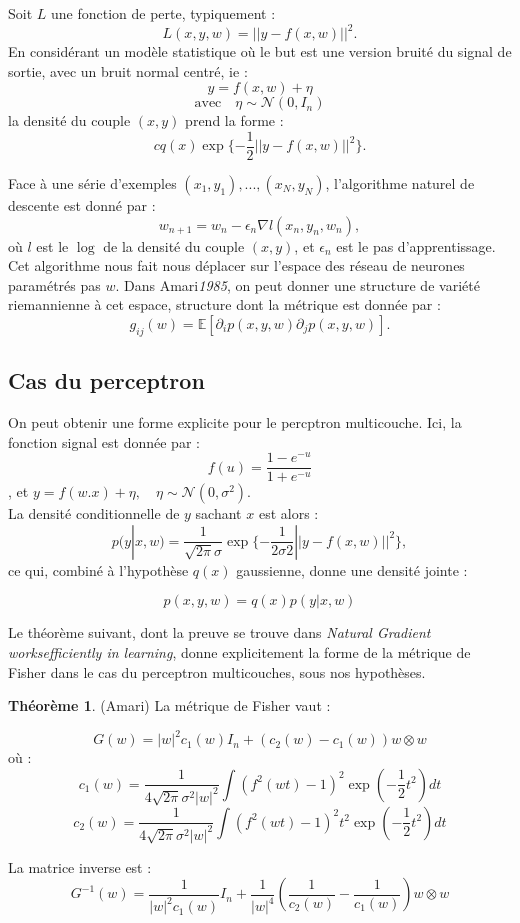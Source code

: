 \documentclass{article}
\theoremstyle{definition}
\newtheorem{thm}{Théorème}
\begin{document}
Soit $L$ une fonction de perte, typiquement : 
\[L(x,y,w)  = ||y-f(x,w)||^2.\] 
En considérant un modèle statistique où le but est une version bruité du signal de sortie, avec un bruit normal centré, ie :
\[y=f(x,w)+\eta\]
\[\text{avec} \quad \eta \sim \mathcal N (0,I_n)\]
la densité du couple $(x,y)$ prend la forme :
\[cq(x)\exp\{-\frac{1}{2}||y-f(x,w)||^2\}.\]

Face à une série d'exemples $(x_1,y_1),...,(x_N,y_N)$, l'algorithme naturel de descente est donné par :
\[w_{n+1}=w_n - \epsilon_n \nabla l(x_n,y_n,w_n), \]
où $l$ est le $\log$ de la densité du couple $(x,y)$, et $\epsilon_n$ est le pas d'apprentissage. Cet algorithme nous fait nous déplacer sur l'espace des réseau de neurones paramétrés pas $w$. Dans Amari\textit{1985}, on peut donner une structure de variété riemannienne à cet espace, structure dont la métrique est donnée par :
\[g_{ij}(w)=\mathbb E[\partial_i p(x,y,w)\partial_j p(x,y,w)].\]

\subsection{Cas du perceptron}

On peut obtenir une forme explicite pour le percptron multicouche.
Ici, la fonction signal est donnée par : \[f(u)=\frac{1-e^{-u}}{1+e^{-u}}\], et $y=f(w.x)+\eta,\quad \eta \sim \mathcal N (0, \sigma^2)$.\\

La densité conditionnelle de $y$ sachant $x$ est alors :
\[p(y|x,w) = \frac{1}{\sqrt{2\pi}\sigma}\exp\{-\frac{1}{2\sigma2}||y-f(x,w)||^2\},\]
ce qui, combiné à l'hypothèse $q(x)$ gaussienne, donne une densité jointe :

\[p(x,y,w) = q(x)p(y|x,w) \]

Le théorème suivant, dont la preuve se trouve dans  \textit{Natural Gradient worksefficiently in learning}, donne explicitement la forme de la métrique de Fisher dans le cas du perceptron multicouches, sous nos hypothèses.

\begin{thm}{(Amari)}
La métrique de Fisher vaut : 

\[G(w)=|w|^2 c_1(w)I_n + (c_2(w)-c_1(w))w\otimes w\]
où :
\[c_1(w)=\frac{1}{4\sqrt{2\pi}\sigma^2|w|^2}\int (f^2(wt)-1)^2\exp(-\frac{1}{2}t^2)dt\]
\[c_2(w)=\frac{1}{4\sqrt{2\pi}\sigma^2|w|^2}\int (f^2(wt)-1)^2t^2\exp(-\frac{1}{2}t^2)dt\]

La matrice inverse est : 
\[G^{-1}(w)=\frac{1}{|w|^2 c_1(w)}I_n+\frac{1}{|w|^4}(\frac{1}{c_2(w)}-\frac{1}{c_1(w)})w\otimes w\]
\end{thm}
 
\end{document}
